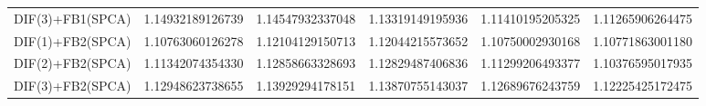 \begin{table}[htb]
\begin{adjustbox}{totalheight=\baselineskip}
\begin{tabular}{lSSSSS}
DIF(3)+FB1(SPCA) & 1.14932189126739 & 1.14547932337048 & 1.13319149195936 & 1.11410195205325 & 1.11265906264475 \\ 
DIF(1)+FB2(SPCA) & 1.10763060126278 & 1.12104129150713 & 1.12044215573652 & 1.10750002930168 & 1.10771863001180 \\ 
DIF(2)+FB2(SPCA) & 1.11342074354330 & 1.12858663328693 & 1.12829487406836 & 1.11299206493377 & 1.10376595017935 \\ 
DIF(3)+FB2(SPCA) & 1.12948623738655 & 1.13929294178151 & 1.13870755143037 & 1.12689676243759 & 1.12225425172475 \\ \bottomrule 
\end{tabular}
\end{adjustbox}
\end{table}



